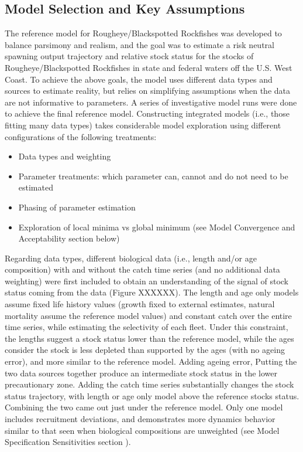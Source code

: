 \documentclass[
]{scrartcl}
\providecommand{\tightlist}{%
  \setlength{\itemsep}{0pt}\setlength{\parskip}{0pt}}\usepackage{longtable,booktabs,array}
\begin{document}
\subsection{Model Selection and Key
Assumptions}\label{model-selection-and-key-assumptions}

The reference model for Rougheye/Blackspotted Rockfishes was developed
to balance parsimony and realism, and the goal was to estimate a risk
neutral spawning output trajectory and relative stock status for the
stocks of Rougheye/Blackspotted Rockfishes in state and federal waters
off the U.S. West Coast. To achieve the above goals, the model uses
different data types and sources to estimate reality, but relies on
simplifying assumptions when the data are not informative to parameters.
A series of investigative model runs were done to achieve the final
reference model. Constructing integrated models (i.e., those fitting
many data types) takes considerable model exploration using different
configurations of the following treatments:

\begin{itemize}
\tightlist
\item
  Data types and weighting
\item
  Parameter treatments: which parameter can, cannot and do not need to
  be estimated
\item
  Phasing of parameter estimation
\item
  Exploration of local minima vs global minimum (see Model Convergence
  and Acceptability section below)
\end{itemize}

Regarding data types, different biological data (i.e., length and/or age
composition) with and without the catch time series (and no additional
data weighting) were first included to obtain an understanding of the
signal of stock status coming from the data (Figure XXXXXX). The length
and age only models assume fixed life history values (growth fixed to
external estimates, natural mortality assume the reference model values)
and constant catch over the entire time series, while estimating the
selectivity of each fleet. Under this constraint, the lengths suggest a
stock status lower than the reference model, while the ages consider the
stock is less depleted than supported by the ages (with no ageing
error), and more similar to the reference model. Adding ageing error,
Putting the two data sources together produce an intermediate stock
status in the lower precautionary zone. Adding the catch time series
substantially changes the stock status trajectory, with length or age
only model above the reference stocks status. Combining the two came out
just under the reference model. Only one model includes recruitment
deviations, and demonstrates more dynamics behavior similar to that seen
when biological compositions are unweighted (see Model Specification
Sensitivities section ).
\end{document}
